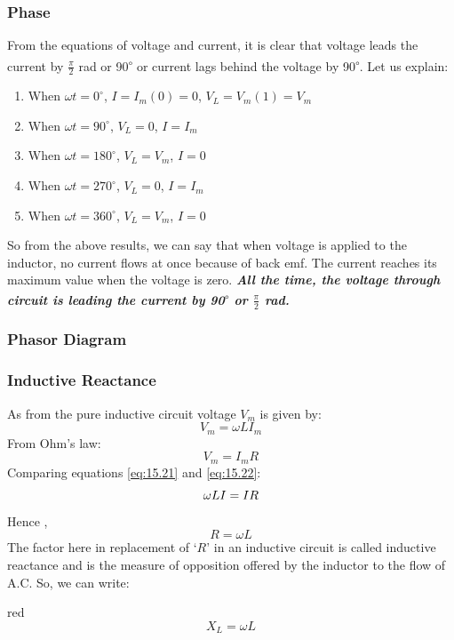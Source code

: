 \subsubsection{Phase}
From the equations of voltage and current, it is clear that voltage leads the current by $\frac{\pi}{2}$ rad or 90\textsuperscript{$\circ$} or current lags behind the voltage by 90\textsuperscript{$\circ$}.
Let us explain:
\begin{enumerate}[label = $\square$]
    \item When $\omega t = 0^{\circ}$, $I=I_{m}(0) = 0$, $V_{L}=V_{m}(1) = V_{m}$
    \item When $\omega t = 90^{\circ}$, $V_{L}=0$, $I=I_{m}$
    \item When $\omega t = 180^{\circ}$, $V_{L}=V_{m}$, $I=0$
    \item When $\omega t = 270^{\circ}$, $V_{L}=0$, $I=I_{m}$
    \item When $\omega t =360^{\circ}$, $V_{L}=V_{m}$, $I=0$
\end{enumerate}

So from the above results, we can say that when voltage is applied to
the inductor, no current flows at once because of back emf.
The current reaches its maximum value when the voltage is zero. 
\textit{\textbf{All the time, the voltage through circuit is leading
the current by 90\textsuperscript{$\circ$} or $\frac{\pi}{2}$ rad.}}

\subsubsection{Phasor Diagram}

\subsubsection{Inductive Reactance}
As from the pure inductive circuit voltage $V_{m}$ is given by:
\begin{equation}\label{eq:15.21}
    V_{m}=\omega LI_{m}
\end{equation}
From Ohm’s law:
\begin{equation}\label{eq:15.22}
    V_{m}= I_{m}R
\end{equation}
Comparing equations \ref{eq:15.21} and \ref{eq:15.22}:
\begin{equation}\notag
    \omega LI = IR
\end{equation}
Hence ,
\begin{equation}
    R = \omega L
\end{equation}
The factor here in replacement of ‘$R$’ in an inductive circuit is
called inductive reactance and is the measure
of opposition offered by the inductor to the flow of A.C. 
\newline
So, we can write:
\begin{mybox}{red}{}
\begin{equation}\label{eq:15.24}
    X_{L} = \omega L
\end{equation}
\end{mybox}
